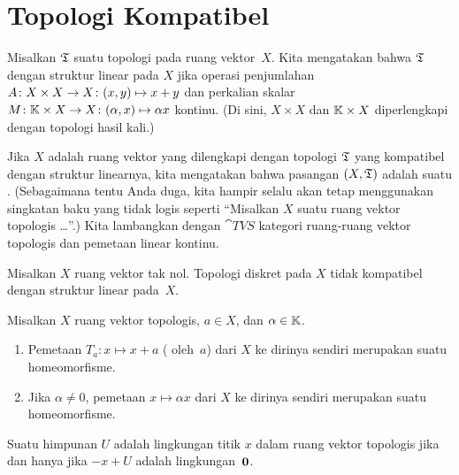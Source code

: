 \section{Topologi Kompatibel}

\begin{defn} Misalkan $\mathfrak{T}$ suatu topologi pada ruang vektor~$X$.  Kita mengatakan bahwa $\mathfrak{T}$
 dengan struktur linear pada $X$ jika operasi penjumlahan $A\colon X \times X \rightarrow X\colon (x,y) \mapsto x + y$
dan perkalian skalar $M\colon \mathbb{K} \times X \rightarrow X\colon (\alpha,x) \mapsto \alpha x$ kontinu.  (Di sini, $X \times X$ dan
$\mathbb{K} \times X$ diperlengkapi dengan topologi hasil kali.)

Jika $X$ adalah ruang vektor yang dilengkapi dengan topologi $\mathfrak{T}$ yang kompatibel dengan struktur linearnya, kita mengatakan bahwa pasangan
$(X,\mathfrak{T})$ adalah suatu
.  (Sebagaimana tentu Anda duga, kita hampir selalu akan tetap menggunakan singkatan baku yang tidak logis seperti
``Misalkan $X$ suatu ruang vektor topologis \dots''.)  Kita lambangkan dengan $\cat{TVS}$ kategori ruang-ruang vektor topologis
dan pemetaan linear kontinu.
\end{defn}

\begin{exam} Misalkan $X$ ruang vektor tak nol.  Topologi diskret pada $X$ tidak kompatibel dengan struktur linear pada~$X$.
\end{exam}

\begin{prop} Misalkan $X$ ruang vektor topologis, $a \in X$, dan $\alpha \in \mathbb{K}$.
   \begin{enumerate}[label=\rm{(\alph*)}]
    \item Pemetaan $T_a\colon x \mapsto x + a$
( oleh~$a$) dari $X$ ke dirinya sendiri merupakan suatu homeomorfisme.
    \item Jika $\alpha \ne 0$, pemetaan $x \mapsto \alpha x$ dari $X$ ke dirinya sendiri merupakan suatu homeomorfisme.
   \end{enumerate}
\end{prop}

\begin{cor} Suatu himpunan $U$ adalah lingkungan titik $x$ dalam ruang vektor topologis jika dan hanya jika $-x + U$ adalah lingkungan~$\mathbf{0}$.
\end{cor}

